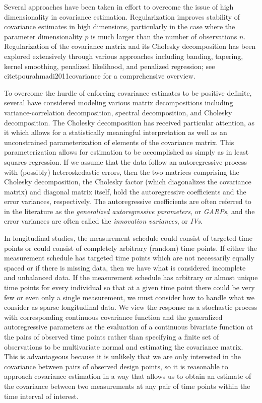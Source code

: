 \documentclass[12pt]{article}
\theoremstyle{definition}
\begin{document}
Several approaches have been taken in effort to overcome the issue of high dimensionality in covariance estimation. Regularization improves stability of covariance estimates in high dimensions, particularly in the case where the parameter dimensionality $p$ is much larger than the number of observations $n$. Regularization of the covariance matrix and its Cholesky decomposition has been explored extensively through various approaches including banding, tapering, kernel smoothing, penalized likelihood, and penalized regression; see citet{pourahmadi2011covariance} for a comprehensive overview. 
	
To overcome the hurdle of enforcing covariance estimates to be positive definite, several have considered modeling various matrix decompositions including variance-correlation decomposition, spectral decomposition, and Cholesky decomposition. The Cholesky decomposition has received particular attention, as it which allows for a statistically meaningful interpretation as well as an unconstrained parameterization of elements of the covariance matrix. This parameterization allows for estimation to be accomplished as simply as in least squares regression. If we assume that the data follow an autoregressive process with (possibly) heteroskedastic errors, then the two matrices comprising the Cholesky decomposition, the Cholesky factor (which diagonalizes the covariance matrix) and diagonal matrix itself, hold the autoregressive coefficients and the error variances, respectively. The autoregressive coefficients are often referred to in the literature as the \emph{generalized autoregressive parameters}, or \emph{GARPs}, and the error variances are often called the \emph{innovation variances}, or \emph{IVs}.

In longitudinal studies, the measurement schedule could consist of targeted time points or could consist of completely arbitrary (random) time points. If either the measurement schedule has targeted time points which are not necessarily equally spaced or if there is missing data, then we have what is considered incomplete and unbalanced data. If the measurement schedule has arbitrary or almost unique time points for every individual so that at a given time point there could be very few or even only a single measurement, we must consider how to handle what we consider as sparse longitudinal data. We view the response as a stochastic process with corresponding continuous covariance function and the generalized autoregressive parameters as the evaluation of a continuous bivariate function at the pairs of observed time points rather than specifying a finite set of observations to be multivariate normal and estimating the covariance matrix. This is advantageous because it is unlikely that we are only interested in the covariance between pairs of observed design points, so it is reasonable to approach covariance estimation in a way that allows us to obtain an estimate of the covariance between two measurements at any pair of time points within the time interval of interest. 
\end{document}
